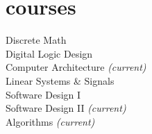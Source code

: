 \documentclass[12pt]{cv}
\begin{document}
\section{courses}%
Discrete Math\\
Digital Logic Design\\
Computer Architecture {\itshape(current)}\\
Linear Systems \& Signals\\
Software Design I\\
Software Design II {\itshape(current)}\\
Algorithms {\itshape(current)}\\
\end{document}
